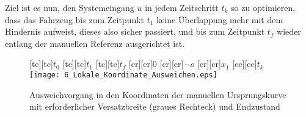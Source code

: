 Ziel ist es nun, den Systemeingang $u$ in jedem Zeitschritt $t_k$ so zu optimieren, dass das Fahrzeug bis zum Zeitpunkt $t_1$ keine Überlappung mehr mit dem Hindernis aufweist, dieses also sicher passiert, und bis zum Zeitpunkt $t_f$ wieder entlang der manuellen Referenz ausgerichtet ist.  

\begin{figure}[h]
\centering
	[tc][tc]{$t_0$}
	[tc][tc]{$t_1$}
	[tc][tc]{$t_f$}
	[cr][cr]{$0$}
	[cr][cr]{$-o$}
	[cr][cr]{$x_1$}
	[cc][cc]{$t_k$}
	\centering
  	\texttt{[image: 6\_Lokale\_Koordinate\_Ausweichen.eps]}
  \caption[Ausweichvorgang in den Koordinaten der Ursprungskurve]{Ausweichvorgang in den Koordinaten der manuellen Ursprungskurve mit erforderlicher Versatzbreite (graues Rechteck) und Endzustand }
    \label{fig:Lokale_Koordinate_Ausweichen}
\end{figure}

